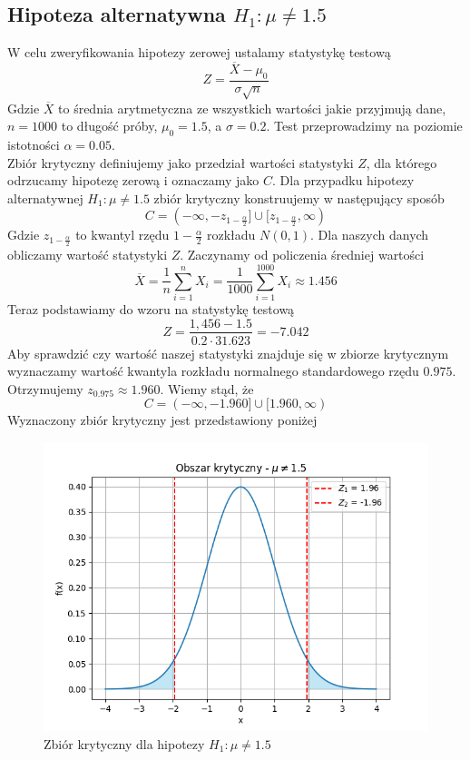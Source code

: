\documentclass{article}
\begin{document}
\subsection{Hipoteza alternatywna $H_{1}:\mu\neq1.5$}
W celu zweryfikowania hipotezy zerowej ustalamy statystykę testową
\begin{equation}
Z = \frac{\overline{X}-\mu_{0}}{\sigma\sqrt{n}}
\end{equation}
Gdzie $\overline{X}$ to średnia arytmetyczna ze wszystkich wartości jakie przyjmują dane, $n=1000$ to długość próby, $\mu_{0}=1.5$, a $\sigma=0.2$. Test przeprowadzimy na poziomie istotności $\alpha=0.05$.\\
Zbiór krytyczny definiujemy jako przedział wartości statystyki $Z$, dla którego odrzucamy hipotezę zerową i oznaczamy jako $C$. Dla przypadku hipotezy alternatywnej $H_{1}:\mu\neq1.5$ zbiór krytyczny konstruujemy w następujący sposób
\begin{equation}
C = (-\infty, -z_{1-\frac{\alpha}{2}}]\cup [z_{1-\frac{\alpha}{2}}, \infty)
\end{equation}
Gdzie $z_{1-\frac{\alpha}{2}}$ to kwantyl rzędu $1-\frac{\alpha}{2}$ rozkładu $N(0,1)$.
Dla naszych danych obliczamy wartość statystyki $Z$. Zaczynamy od policzenia średniej wartości  
\begin{equation}
\overline{X} = \frac{1}{n}\sum_{i=1}^{n}X_{i} = \frac{1}{1000}\sum_{i=1}^{1000}X_{i} \approx1.456
\end{equation}
Teraz podstawiamy do wzoru na statystykę testową
\begin{equation}
Z = \frac{1,456-1.5}{0.2\cdot31.623} = -7.042
\end{equation}
Aby sprawdzić czy wartość naszej statystyki znajduje się w zbiorze krytycznym wyznaczamy wartość kwantyla rozkładu normalnego standardowego rzędu $0.975$. Otrzymujemy $z_{0.975}\approx1.960$. Wiemy stąd, że 
\begin{equation}
C = (-\infty,-1.960]\cup[1.960,\infty)
\end{equation}
Wyznaczony zbiór krytyczny jest przedstawiony poniżej
\begin{figure}[H]
    \centering
    \includegraphics[scale=0.5]{mu_neq.png}
    \caption{Zbiór krytyczny dla hipotezy $H_{1}:\mu\neq1.5$}
    \label{fig:1}
\end{figure}
\end{document}
